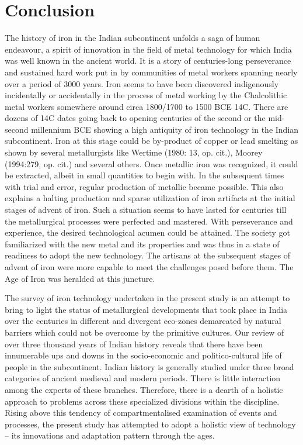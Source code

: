 \chapter{Conclusion}\label{chapter8}




The history of iron in the Indian subcontinent unfolds a saga of human endeavour, a spirit of innovation in the field of metal technology for which India was well known in the ancient world. It is a story of centuries-long perseverance and sustained hard work put in by communities of metal workers spanning nearly over a period of 3000 years. Iron seems to have been discovered indigenously incidentally or accidentally in the process of metal working by the Chalcolithic metal workers somewhere around circa 1800/1700 to 1500 BCE 14C. There are dozens of 14C dates going back to opening centuries of the second or the mid- second millennium BCE showing a high antiquity of iron technology in the Indian subcontinent. Iron at this stage could be by-product of copper or lead smelting as shown by several metallurgists like Wertime (1980: 13, op. cit.), Moorey (1994:279, op. cit.) and several others. Once metallic iron was recognized, it could be extracted, albeit in small quantities to begin with. In the subsequent times with trial and error, regular production of metallic became possible. This also explains a halting production and sparse utilization of iron artifacts at the initial stages of advent of iron. Such a situation seems to have lasted for centuries till the metallurgical processes were perfected and mastered. With perseverance and experience, the desired technological acumen could be attained. The society got familiarized with the new metal and its properties and was thus in a state of readiness to adopt the new technology. The artisans at the subsequent stages of advent of iron were more capable to meet the challenges posed before them. The Age of Iron was heralded at this juncture.  

The survey of iron technology undertaken in the present study is an attempt to bring to light the status of metallurgical developments that took place in India over the centuries in different and divergent eco-zones demarcated by natural barriers which could not be overcome by the primitive cultures. Our review of over three thousand years of Indian history reveals that there have been innumerable ups and downs in the socio-economic and politico-cultural life of people in the subcontinent. Indian history is generally studied under three broad categories of ancient medieval and modern periods. There is little interaction among the experts of these branches. Therefore, there is a dearth of a holistic approach to problems across these specialized divisions within the discipline. Rising above this tendency of compartmentalised examination of events and processes, the present study has attempted to adopt a holistic view of technology – its innovations and adaptation pattern through the ages. 


